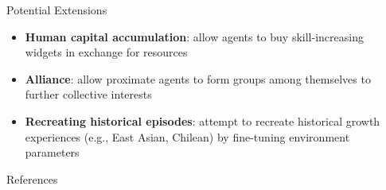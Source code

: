 \documentclass[final]{beamer}
\newlength{\sepwid}
\newlength{\onecolwid}
\newcommand{\separatorcolumn}{\begin{column}{\sepwid}\end{column}}
\begin{document}
\begin{frame}[t]
\begin{columns}[t]
\begin{column}{\onecolwid}
  \begin{block}{Potential Extensions}
  \begin{itemize}
      \item \textbf{Human capital accumulation}: allow agents to buy skill-increasing widgets in exchange for resources 
      \item \textbf{Alliance}: allow proximate agents to form groups among themselves to further collective interests
      \item \textbf{Recreating historical episodes}: attempt to recreate historical growth experiences (e.g., East Asian, Chilean) by fine-tuning environment parameters 
  \end{itemize}
  \vspace{0.25cm}
  \end{block}


\begin{block}{References}
\small{
}
\end{block}

\end{column}

\separatorcolumn
\end{columns}
\end{frame}
\end{document}
